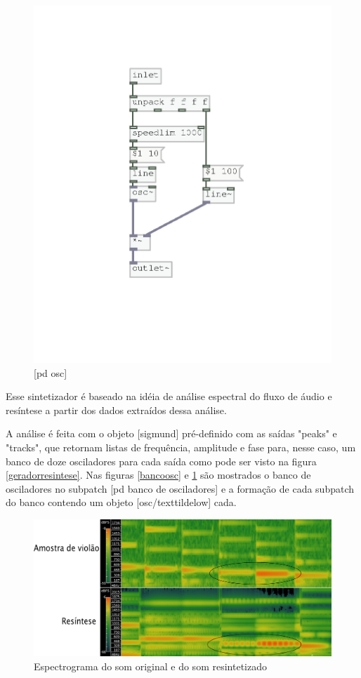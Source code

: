 \documentclass{ppgmus}
\begin{document}
\begin{figure}
\includegraphics[scale=.7]{osc-base}
\caption{[pd osc]}
\label{pdosc}
\end{figure}



Esse sintetizador é baseado na idéia de análise espectral do fluxo
de áudio e resíntese a partir dos dados extraídos dessa análise.

A análise é feita com o objeto [sigmund\texttildelow] pré-definido com
as saídas "peaks" e "tracks", que retornam listas de frequência, amplitude e 
fase para, nesse caso, um banco de doze osciladores para cada saída como pode 
ser visto na figura \ref{geradorresintese}.
Nas figuras \ref{bancoosc} e \ref{pdosc} são mostrados o banco de osciladores no subpatch
[pd banco de osciladores] e a formação de cada subpatch do banco contendo um objeto [osc/texttildelow]
cada. 


\begin{figure}
\includegraphics[scale=.5]{spectro}
\caption{Espectrograma do som original e do som resintetizado}
\label{spectro}
\end{figure}
 
\end{document}
